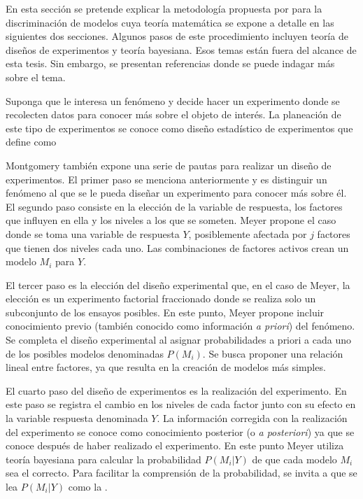 En esta sección se pretende explicar la metodología propuesta por \cite{meyer1996} para la discriminación de modelos cuya teoría matemática se expone a detalle en las siguientes dos secciones. Algunos pasos de este procedimiento incluyen teoría de diseños de experimentos y teoría bayesiana. Esos temas están fuera del alcance de esta tesis. Sin embargo, se presentan referencias donde se puede indagar más sobre el tema. 

Suponga que le interesa un fenómeno y decide hacer un experimento donde se recolecten datos para conocer más sobre el objeto de interés. La planeación de este tipo de experimentos se conoce como diseño estadístico de experimentos que \cite{montgomery2017design} define como 

Montgomery también expone una serie de pautas para realizar un diseño de experimentos. El primer paso se menciona anteriormente y es distinguir un fenómeno al que se le pueda diseñar un experimento para conocer más sobre él. El segundo paso consiste en la elección de la variable de respuesta, los factores que influyen en ella y los niveles a los que se someten. Meyer propone el caso donde se toma una variable de respuesta $Y$, posiblemente afectada por $j$ factores que tienen dos niveles cada uno. Las combinaciones de factores activos crean un modelo $M_i$ para $Y$.

El tercer paso es la elección del diseño experimental que, en el caso de Meyer, la elección es un experimento factorial fraccionado donde se realiza solo un subconjunto de los ensayos posibles. En este punto, Meyer propone incluir conocimiento previo (también conocido como información \textit{a priori}) del fenómeno. Se completa el diseño experimental al asignar probabilidades a priori a cada uno de los posibles modelos denominadas $P(M_i)$. Se busca proponer una relación lineal entre factores, ya que resulta en la creación de modelos más simples. 

El cuarto paso del diseño de experimentos es la realización del experimento. En este paso se registra el cambio en los niveles de cada factor junto con su efecto en la variable respuesta denominada $Y$. La información corregida con la realización del experimento se conoce como conocimiento posterior (o \textit{a posteriori}) ya que se conoce después de haber realizado el experimento. En este punto Meyer utiliza teoría bayesiana para calcular la probabilidad $P(M_i | Y)$ de que cada modelo $M_i$ sea el correcto. Para facilitar la comprensión de la probabilidad, se invita a que se lea $P(M_i | Y)$ como la . 

